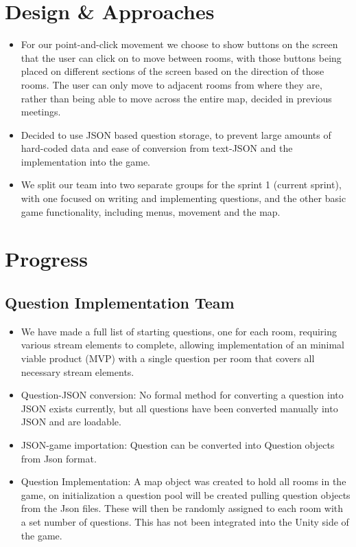 \documentclass{article}
\begin{document}
\section*{Design \& Approaches}
\begin{itemize}
    \item For our point-and-click movement we choose to show buttons on the screen that the user can click on to move between rooms, with those buttons being placed on different sections of the screen based on the direction of those rooms. The user can only move to adjacent rooms from where they are, rather than being able to move across the entire map, decided in previous meetings.
    \item Decided to use JSON based question storage, to prevent large amounts of hard-coded data and ease of conversion from text-JSON and the implementation into the game.
    \item We split our team into two separate groups for the sprint 1 (current sprint), with one focused on writing and implementing questions, and the other basic game functionality, including menus, movement and the map.
\end{itemize}


\section*{Progress}
\subsection*{Question Implementation Team}
\begin{itemize}
    \item We have made a full list of starting questions, one for each room, requiring various stream elements to complete, allowing implementation of an minimal viable product (MVP) with a single question per room that covers all necessary stream elements.
    \item Question-JSON conversion: No formal method for converting a question into JSON exists currently, but all questions have been converted manually into JSON and are loadable.
    \item JSON-game importation: Question can be converted into Question objects from Json format.
    \item Question Implementation: A map object was created to hold all rooms in the game, on initialization a question pool will be created pulling question objects from the Json files. These will then be randomly assigned to each room with a set number of questions. This has not been integrated into the Unity side of the game.
\end{itemize}
\end{document}
